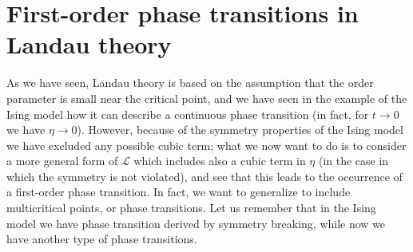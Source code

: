 \documentclass[../../Main/Main.tex]{subfiles}
\begin{document}
\section{First-order phase transitions in Landau theory}

As we have seen, Landau theory is based on the assumption that the order parameter is small near the critical point, and we have seen in the example of the Ising model how it can describe a continuous phase transition (in fact, for \( t \rightarrow 0 \) we have \( \eta \rightarrow 0 \)).
However, because of the symmetry properties of the Ising model we have excluded any possible cubic term; what we now want to do is to consider a more general form of
\( \mathcal{L} \) which includes also a cubic term in \( \eta  \) (in the case in which the symmetry is not violated), and see that this leads to the occurrence of a first-order phase transition.
In fact, we want to generalize to include multicritical points, or phase transitions. Let us remember that in the Ising model we have phase transition derived by symmetry breaking, while now we have another type of phase transitions.
\end{document}
